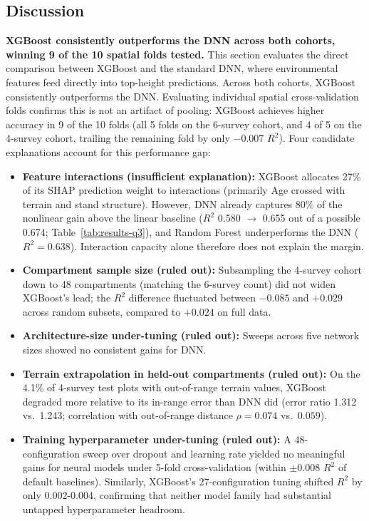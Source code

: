 \documentclass[logo,msc,ai]{infthesis}           %
\begin{document}
\subsection{Discussion}
\textbf{XGBoost consistently outperforms the DNN across both cohorts, winning 9 of the 10 spatial folds tested.}
This section evaluates the direct comparison between XGBoost and the standard DNN, where environmental features feed directly into top-height predictions. Across both cohorts, XGBoost consistently outperforms the DNN. Evaluating individual spatial cross-validation folds confirms this is not an artifact of pooling: XGBoost achieves higher accuracy in 9 of the 10 folds (all 5 folds on the 6-survey cohort, and 4 of 5 on the 4-survey cohort, trailing the remaining fold by only $-0.007$ $R^2$). Four candidate explanations account for this performance gap:

\begin{itemize}
\item \textbf{Feature interactions (insufficient explanation):} XGBoost allocates 27\% of its SHAP prediction weight to interactions (primarily Age crossed with terrain and stand structure). However, DNN already captures 80\% of the nonlinear gain above the linear baseline ($R^2$ 0.580 $\to$ 0.655 out of a possible 0.674; Table~\ref{tab:results-q3}), and Random Forest underperforms the DNN ($R^2 = 0.638$). Interaction capacity alone therefore does not explain the margin.
\item \textbf{Compartment sample size (ruled out):} Subsampling the 4-survey cohort down to 48 compartments (matching the 6-survey count) did not widen XGBoost's lead; the $R^2$ difference fluctuated between $-0.085$ and $+0.029$ across random subsets, compared to $+0.024$ on full data.
\item \textbf{Architecture-size under-tuning (ruled out):} Sweeps across five network sizes showed no consistent gains for DNN.
\item \textbf{Terrain extrapolation in held-out compartments (ruled out):} On the 4.1\% of 4-survey test plots with out-of-range terrain values, XGBoost degraded more relative to its in-range error than DNN did (error ratio 1.312 vs.\ 1.243; correlation with out-of-range distance $\rho=0.074$ vs.\ $0.059$).
\item \textbf{Training hyperparameter under-tuning (ruled out):} A 48-configuration sweep over dropout and learning rate yielded no meaningful gains for neural models under 5-fold cross-validation (within $\pm0.008$ $R^2$ of default baselines). Similarly, XGBoost's 27-configuration tuning shifted $R^2$ by only 0.002-0.004, confirming that neither model family had substantial untapped hyperparameter headroom.
\end{itemize}
\end{document}
